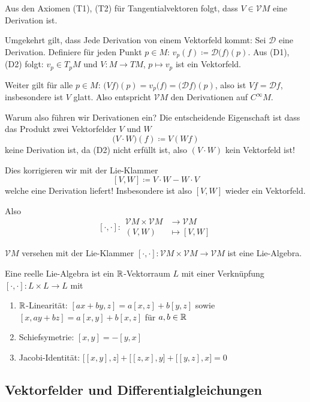 \documentclass[a4paper,twoside,DIV15,BCOR12mm]{scrbook}
\renewcommand{\da}{\coloneqq}
\newcommand{\V}{\mathcal V}
\begin{document}
Aus den Axiomen (T1), (T2) für Tangentialvektoren folgt, dass $V\in\V M $ eine Derivation ist.

Umgekehrt gilt, dass Jede Derivation von einem Vektorfeld kommt:  Sei $\mathcal D$ eine Derivation. Definiere für jeden Punkt $p\in M$: $v_p(f) \da \mathcal D\big(f\big)(p)$. Aus (D1), (D2) folgt: $v_p\in T_pM$ und $V: M \to TM$, $p\mapsto v_p$ ist ein Vektorfeld.

Weiter gilt für alle $p\in M$: $\big(Vf\big)(p) = v_p\big(f\big) = \big(\mathcal D f\big) (p)$, also ist $Vf = \mathcal D f$, insbesondere ist $V$ glatt. Also entspricht $\V M $ den Derivationen auf $C^\infty M$.

Warum also führen wir Derivationen ein? Die entscheidende Eigenschaft ist dass das Produkt zwei Vektorfelder $V$ und $W$
\[
\big(V \cdot W\big) (f) \da V (W f)
\]
keine Derivation ist, da (D2) nicht erfüllt ist, also $(V\cdot W)$ kein Vektorfeld ist!

Dies korrigieren wir mit der Lie-Klammer
\[
[V,W] \da V\cdot W  - W\cdot V
\]
welche eine Derivation liefert! Insbesondere ist also $[V,W]$ wieder ein Vektorfeld.

Also 
\[[\cdot,\cdot]:
\begin{aligned}
\V M  \times \V M  &\to \V M  \\
(V,W) &\mapsto [V,W]
\end{aligned}
\]

\begin{lemma}
$\V M $ versehen mit der Lie-Klammer $[\cdot,\cdot]:\V M  \times \V M  \to \V M $ ist eine Lie-Algebra.
\label{lem5}
\end{lemma}

\begin{definition}
Eine reelle Lie-Algebra ist ein $\mathbb{R}$-Vektorraum $L$ mit einer Verknüpfung $[\cdot,\cdot]: L\times L \to L$ mit 
\begin{enumerate}[(L1)]
\item $\mathbb{R}$-Linearität: $[ax+by, z] = a [x,z] + b[y,z]$ sowie
$[x,ay + bz] = a[x,y] + b[x,z]$ für $a,b\in\mathbb{R}$
\item Schiefsymetrie: $[x,y] = -[y,x]$
\item Jacobi-Identität: $\big[ [x,y], z\big] + \big[ [z,x], y\big] + \big[[y,z], x\big] = 0$
\end{enumerate}
\end{definition}

\subsection*{Vektorfelder und Differentialgleichungen}
\end{document}

